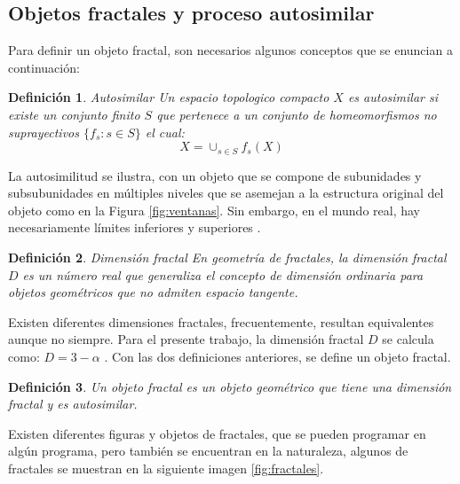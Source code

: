 \documentclass[letterpaper,titlepage,12pt,draft]{report}
\newtheorem{definition}{Definici\'on}
\begin{document}
\subsection{Objetos fractales y proceso autosimilar}

Para definir un objeto fractal, son necesarios algunos conceptos que se enuncian a continuaci\'on:

\begin{definition}{Autosimilar}
Un espacio topologico compacto $X$ es autosimilar si existe un conjunto finito $S$ que pertenece a un conjunto de homeomorfismos no suprayectivos $\{f_s : s \in S\}$ el cual: $$X=\displaystyle \cup_{s \in S} f_s(X)$$
\end{definition}

La autosimilitud se ilustra, con un objeto que se compone de subunidades y subsubunidades en m\'ultiples niveles que se asemejan a la estructura original del objeto como en la Figura \ref{fig:ventanas}.  Sin embargo, en el mundo real, hay necesariamente l\'imites inferiores y superiores \cite{Frac}.\\

\begin{definition}{Dimensi\'on fractal}
En geometr\'ia de fractales, la dimensi\'on fractal $D$ es un n\'umero real que generaliza el concepto de dimensi\'on ordinaria para objetos geom\'etricos que no admiten espacio tangente.
\end{definition}

Existen diferentes dimensiones fractales, frecuentemente, resultan equivalentes aunque no siempre. Para el presente trabajo, la dimensi\'on fractal $D$ se calcula como: $D=3-\alpha$ \cite{Peng}. Con las dos definiciones anteriores, se define un objeto fractal.  

\begin{definition}
Un objeto fractal es un objeto geom\'etrico que tiene una dimensi\'on fractal y es autosimilar. \cite{Goldbberge}
\end{definition}

Existen diferentes figuras y objetos de fractales, que se pueden programar en alg\'un programa, pero tambi\'en se encuentran en la naturaleza, algunos de fractales se muestran en la siguiente imagen \ref{fig:fractales}.
\end{document}
